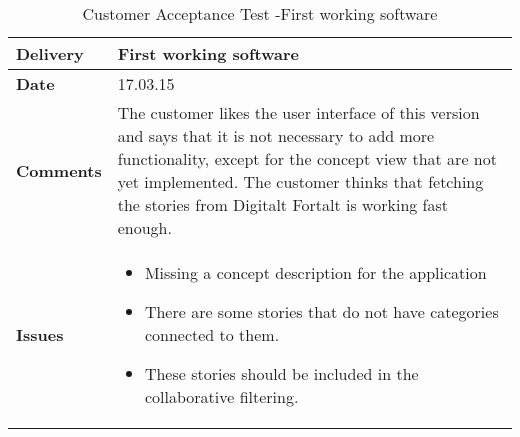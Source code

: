 			\renewcommand{\arraystretch}{2}%
			\begin{center}
				\begin{longtable}{ | p{4cm} | p{13cm} | }
					
					\caption[Customer Acceptance test]{Customer Acceptance Test -First working software } \label{Tab:cattest3}\\
					\hline
					\textbf{Delivery} & First working software\\ \hline
					\textbf{Date} & 17.03.15 \\ \hline
					\textbf{Comments} & The customer likes the user interface of this version and says that it is not necessary to add more functionality, except for the concept view that are not yet implemented. The customer thinks that fetching the stories from Digitalt Fortalt is working fast enough.  \\ \hline			
					\textbf{Issues} & 
					\begin{itemize}[noitemsep]
						
						\item Missing a concept description for the application 
						\item There are some stories that do not have categories connected to them. 
						\item These stories should be included in the collaborative filtering.
					\end{itemize}
					\\ \hline		
				\end{longtable}
			\end{center}
			
